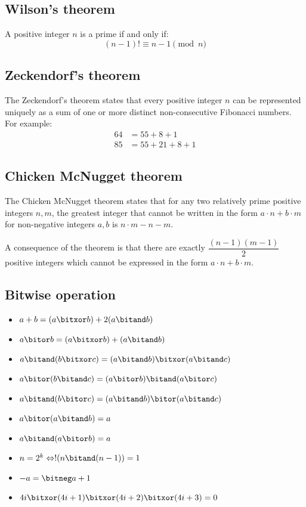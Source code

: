 \subsection{Wilson's theorem}
A positive integer $n$ is a prime if and only if:
\[ (n - 1)! \equiv n - 1 \pmod n \]

\subsection{Zeckendorf’s theorem}
The Zeckendorf's theorem states that every positive integer $n$ can be represented
uniquely as a sum of one or more distinct non-consecutive Fibonacci numbers.
For example:
  \vspace{-0.3cm}
  \begin{align*}
    64 &= 55 + 8 + 1 \\
    85 &= 55 + 21 + 8 + 1
  \end{align*}
  \vspace{-0.45cm}

\subsection{Chicken McNugget theorem}
The Chicken McNugget theorem states that for any two relatively prime positive integers
$n, m$, the greatest integer that cannot be written in the form $a \cdot n + b \cdot m$
for non-negative integers $a, b$ is $n \cdot m - n - m$.

A consequence of the theorem is that there are exactly $\dfrac{(n - 1)(m - 1)}{2}$
positive integers which cannot be expressed in the form $a \cdot n + b \cdot m$.

\subsection{Bitwise operation}
\begin{multicols}{2}
\vspace{-\topsep}
\begin{itemize}[leftmargin=*]
    \setlength{\parskip}{0pt}
  \setlength{\itemsep}{0pt plus 1pt}
  \item $a + b = (a \bitxor b) + 2(a \bitand b)$
  \item $a \bitor b = (a \bitxor b) + (a \bitand b)$
  \item $a \bitand (b \bitxor c) = (a \bitand b) \bitxor (a \bitand c)$
  \item $a \bitor (b \bitand c) = (a \bitor b) \bitand (a \bitor c)$
  \item $a \bitand (b \bitor c) = (a \bitand b) \bitor (a \bitand c)$
  \item $a \bitor (a \bitand b) = a$
  \item $a \bitand (a \bitor b) = a$
  \item $n = 2^{k} \Leftrightarrow !(n \bitand (n - 1)) = 1$
  \item $-a = \bitneg a + 1$
  \item $4i \bitxor (4i + 1) \bitxor (4i + 2) \bitxor (4i + 3) = 0$
\end{itemize}
\vspace{-\topsep}
\end{multicols}

